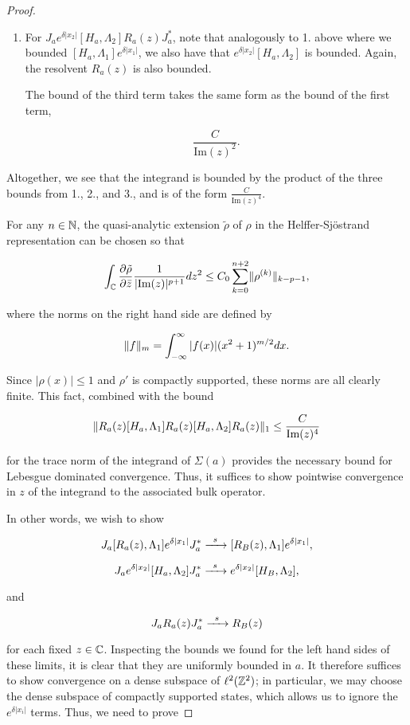 \documentclass[12pt, letterpaper]{article}
\begin{document}
\begin{proof}
\begin{enumerate}
\item For $J_a e^{\delta|x_2|} [H_a,\Lambda_2] R_a(z)J_a^*$, note that analogously to 1. above where we bounded $[H_a,\Lambda_1]e^{\delta|x_1|}$, we also have that $e^{\delta|x_2|}[H_a,\Lambda_2]$ is bounded. Again, the resolvent $R_a(z)$ is also bounded.

The bound of the third term takes the same form as the bound of the first term,

\[\frac{C}{\text{Im}(z)^2}.\]

\end{enumerate}

Altogether, we see that the integrand is bounded by the product of the three bounds from 1., 2., and 3., and is of the form $\frac{C}{\text{Im}(z)^4}$. 

For any $n\in \mathbb{N}$, the quasi-analytic extension $\tilde{\rho}$ of $\rho$ in the Helffer-Sj\"{o}strand representation can be chosen so that 

\[\int_{\mathbb{C}}\frac{\partial \tilde{\rho}}{\partial \bar{z}} \frac{1}{|\text{Im}(z)|^{p+1}}dz^2 \leq C_0 \sum_{k=0}^{n+2 }\lVert \rho^{(k)} \rVert_{k-p-1},\]

where the norms on the right hand side are defined by 

\[\lVert f \rVert_{m} = \int_{-\infty}^\infty |f(x)|(x^2+1)^{m/2}dx.\]

Since $|\rho(x)|\leq 1$ and $\rho'$ is compactly supported, these norms are all clearly finite. This fact, combined with the bound 

\[\lVert R_a(z)[H_a,\Lambda_1]R_a(z)[H_a,\Lambda_2]R_a(z) \rVert_1 \leq \frac{C}{\text{Im}(z)^4}\]

for the trace norm of the integrand of $\Sigma(a)$ provides the necessary bound for Lebesgue dominated convergence. Thus, it suffices to show pointwise convergence in $z$ of the integrand to the associated bulk operator. 

In other words, we wish to show 

\[ J_a[R_a(z),\Lambda_1]e^{\delta|x_1|}J_a^* \xrightarrow{\enskip s \enskip} [R_B(z), \Lambda_1]e^{\delta|x_1|},\]

\[J_ae^{\delta|x_2|}[H_a,\Lambda_2]J_a^* \xrightarrow{\enskip s \enskip} e^{\delta|x_2|}[H_B, \Lambda_2],\]

and 

\[J_aR_a(z)J_a^* \xrightarrow{\enskip s \enskip} R_B(z)\]

for each fixed $z\in\mathbb{C}$. Inspecting the bounds we found for the left hand sides of these limits, it is clear that they are uniformly bounded in $a$. It therefore suffices to show convergence on a dense subspace of $\ell^2(\mathbb{Z}^2)$; in particular, we may choose the dense subspace of compactly supported states, which allows us to ignore the $e^{\delta|x_i|}$ terms. Thus, we need to prove 


\end{proof}
\end{document}
